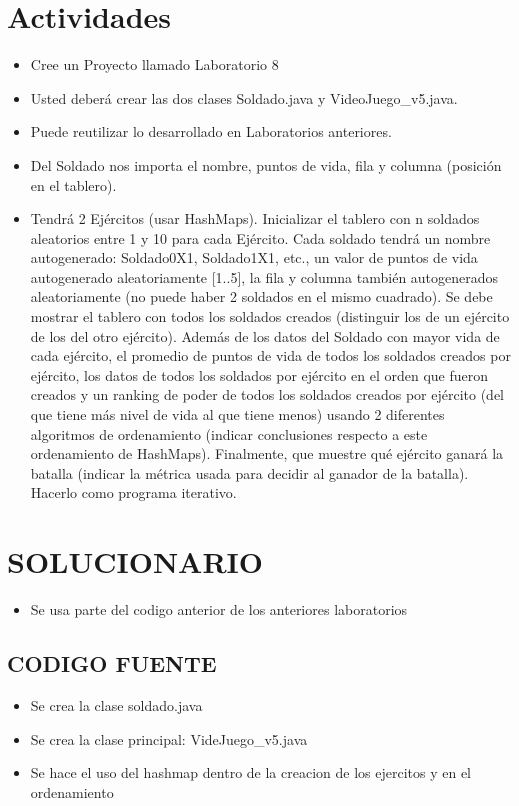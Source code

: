 \documentclass{article}
\begin{document}
	\section{Actividades}
	\begin{itemize}		
		\item Cree un Proyecto llamado Laboratorio 8
		\item Usted deberá crear las dos clases Soldado.java y VideoJuego_v5.java. 
		\item Puede reutilizar lo desarrollado en Laboratorios anteriores.
		\item Del Soldado nos importa el nombre, puntos de vida, fila y columna (posición en el tablero).
		
\item Tendrá 2 Ejércitos (usar HashMaps). Inicializar el tablero con n soldados aleatorios entre 1 y
10 para cada Ejército. Cada soldado tendrá un nombre autogenerado: Soldado0X1,
Soldado1X1, etc., un valor de puntos de vida autogenerado aleatoriamente [1..5], la fila y
columna también autogenerados aleatoriamente (no puede haber 2 soldados en el mismo
cuadrado). Se debe mostrar el tablero con todos los soldados creados (distinguir los de un
ejército de los del otro ejército). Además de los datos del Soldado con mayor vida de cada
ejército, el promedio de puntos de vida de todos los soldados creados por ejército, los datos
de todos los soldados por ejército en el orden que fueron creados y un ranking de poder de
todos los soldados creados por ejército (del que tiene más nivel de vida al que tiene menos)
usando 2 diferentes algoritmos de ordenamiento (indicar conclusiones respecto a este ordenamiento de HashMaps). Finalmente, que muestre qué ejército ganará la batalla (indicar
la métrica usada para decidir al ganador de la batalla). Hacerlo como programa iterativo.

	
	\end{itemize}
		
	\section{SOLUCIONARIO}
	\begin{itemize}
		\item Se usa parte del codigo anterior de los anteriores laboratorios
	\end{itemize}

	\subsection{CODIGO FUENTE}
	\begin{itemize}	
		\item Se crea la clase soldado.java
		\item Se crea la clase principal:   VideJuego_v5.java
\item 	Se hace el uso del hashmap dentro de la creacion de los ejercitos  y en el ordenamiento 
			
	\end{itemize}
	
\end{document}
